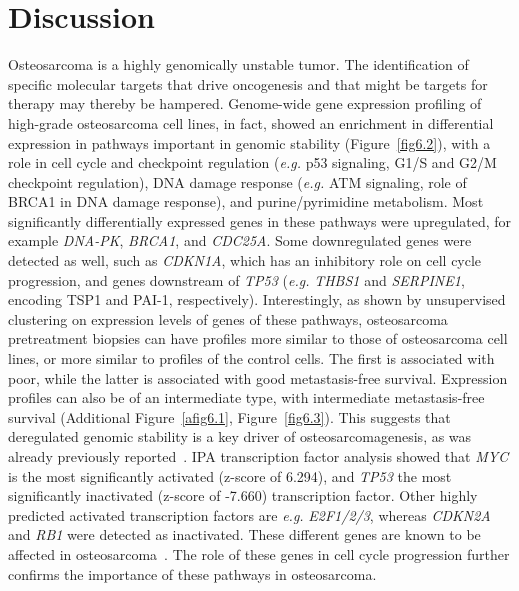 \section{Discussion}\label{discussion6}
Osteosarcoma is a highly genomically unstable tumor. The identification of specific molecular targets that drive oncogenesis and that might be targets for therapy may thereby be hampered. Genome\hyp{}wide gene expression profiling of high\hyp{}grade osteosarcoma cell lines, in fact, showed an enrichment in differential expression in pathways important in genomic stability (Figure~\ref{fig6.2}), with a role in cell cycle and checkpoint regulation ({\it e.g.} p53 signaling, G1/S and G2/M checkpoint regulation), DNA damage response ({\it e.g.} ATM signaling, role of BRCA1 in DNA damage response), and purine/pyrimidine metabolism. Most significantly differentially expressed genes in these pathways were upregulated, for example {\it DNA-PK}, {\it BRCA1}, and {\it CDC25A}. Some downregulated genes were detected as well, such as {\it CDKN1A}, which has an inhibitory role on cell cycle progression, and genes downstream of {\it TP53} ({\it e.g.} {\it THBS1} and {\it SERPINE1}, encoding TSP1 and PAI-1, respectively). Interestingly, as shown by unsupervised clustering on expression levels of genes of these pathways, osteosarcoma pretreatment biopsies can have profiles more similar to those of osteosarcoma cell lines, or more similar to profiles of the control cells. The first is associated with poor, while the latter is associated with good metastasis\hyp{}free survival. Expression profiles can also be of an intermediate type, with intermediate metastasis\hyp{}free survival (Additional Figure~\ref{afig6.1}, Figure~\ref{fig6.3}). This suggests that deregulated genomic stability is a key driver of osteosarcomagenesis, as was already previously reported~\cite{kuijjer2012identification}. IPA transcription factor analysis showed that {\it MYC} is the most significantly activated (z-score of 6.294), and {\it TP53} the most significantly inactivated (z-score of -7.660) transcription factor. Other highly predicted activated transcription factors are {\it e.g.} {\it E2F1/2/3}, whereas {\it CDKN2A} and {\it RB1} were detected as inactivated. These different genes are known to be affected in osteosarcoma~\cite{cleton2005central,kuijjer2012identification,mohseny2010small}. The role of these genes in cell cycle progression further confirms the importance of these pathways in osteosarcoma.


